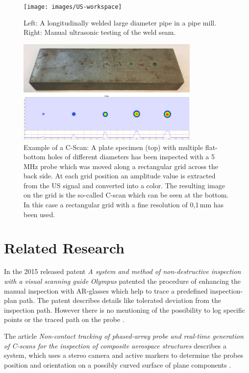 \documentclass{VRARWorkshop}
\begin{document}
\begin{figure}[h!]
    \begin{center}
        \texttt{[image: images/US-workspace]}
        \caption{\label{fig:manual_UT} Left: A longitudinally welded large diameter pipe in a pipe mill.
				Right: Manual ultrasonic testing of the weld seam.}
    \end{center}
\end{figure}
\begin{figure}[h!]
    \begin{center}
        \includegraphics[width=0.8\textwidth]{images/CScan}
        \caption{\label{fig:cScan} Example of a C-Scan: A plate specimen (top) with multiple flat-bottom holes of different diameters has been inspected with a 5 MHz probe which was moved along a rectangular grid across the back side.
        At each grid position an amplitude value is extracted from the US signal and converted into a color. The resulting image on the grid is the so-called C-scan which can be seen at the bottom.
				In this case a rectangular grid with a fine resolution of 0,1\,mm has been used.}
    \end{center}
\end{figure}

\section{Related Research}
In the 2015 released patent \textit{A system and method of non-destructive inspection with a visual scanning guide} \textit{Olympus} patented the procedure of enhancing the manual inspection with AR-glasses which help to trace a predefined inspection-plan path.
The patent describes details like tolerated deviation from the inspection path.
However there is no mentioning of the possibility to log specific points or the traced path on the probe \cite{ARPat15}.

The article \textit{Non-contact tracking of phased-array probe and real-time generation of C-scans for the inspection of composite aerospace structures} describes a system, which uses a stereo camera and active markers to determine the probes position and orientation on a possibly curved surface of plane components \cite{walter_non-contact_2017}.
\end{document}
